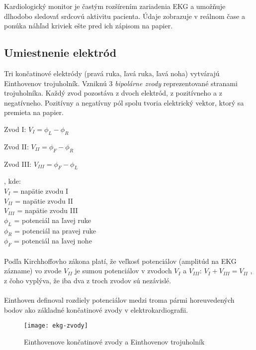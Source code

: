 \documentclass[titlepage,12pt]{article}
\begin{document}
Kardiologický monitor je častým rozšírením zariadenia EKG a umožňuje dlhodobo sledovať srdcovú aktivitu pacienta. Údaje zobrazuje v reálnom čase a ponúka náhľad kriviek ešte pred ich zápisom na papier.


\newpage

\subsection{Umiestnenie elektród}
Tri končatinové elektródy (pravá ruka, ľavá ruka, ľavá noha)  vytvárajú Einthovenov trojuholník. Vzniknú 3 \emph{bipolárne zvody} reprezentované stranami trojuholníka. Každý zvod pozostáva \linebreak z dvoch elektród, z pozitívneho a z negatívneho. Pozitívny a negatívny pól spolu tvoria elektrický vektor, ktorý sa premieta na papier.

\begin{description}
	\item Zvod I: \tabto{1cm} $V_{I} = \phi_L - \phi_R$
	\item Zvod II: \tabto{1cm} $V_{II} = \phi_F - \phi_R$
	\item Zvod III:	\tabto{1cm} $V_{III} = \phi_F - \phi_L$
\end{description}
, kde: \\
\tabto{1cm} $V_{I}$ = napätie zvodu I\\
\tabto{1cm} $V_{II}$ = napätie zvodu II\\
\tabto{1cm} $V_{III}$ = napätie zvodu III\\
\tabto{1cm} $\phi_L$ = potenciál na ľavej ruke\\
\tabto{1cm} $\phi_R$ = potenciál na pravej ruke\\
\tabto{1cm} $\phi_F$ = potenciál na ľavej nohe\\
\\
Podľa Kirchhoffovho zákona platí, že veľkosť potenciálov (amplitúd na EKG zázname) vo zvode $V_{II}$ je sumou potenciálov v zvodoch $V_{I}$ a  $V_{III}$:
\tabto{1cm} $V_{I} + V_{III} = V_{II}$
, z čoho vyplýva, že iba dva z troch zvodov sú nezávislé.
\\
\\
Einthoven definoval rozdiely potenciálov medzi troma pármi horeuvedených bodov ako základné končatinové zvody v elektrokardiografii.


\begin{figure}[!ht]
\begin{center}
\texttt{[image: ekg-zvody]}
\caption{Einthovenove končatinové zvody a Einthovenov trojuholník}
\end{center}
\end{figure}
\end{document}
